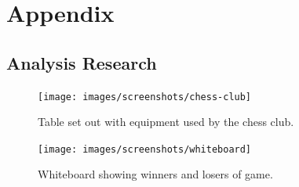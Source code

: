 \appendix
\chapter{Appendix} \label{appendix}
\section{Analysis Research}
\begin{figure}[H]
	\centering
	\texttt{[image: images/screenshots/chess-club]}
	\caption{Table set out with equipment used by the chess club.}
	\label{chess-club}
\end{figure}
\begin{figure}[H]
	\centering
	\texttt{[image: images/screenshots/whiteboard]}
	\caption{Whiteboard showing winners and losers of game.}
	\label{whiteboard}
\end{figure}
